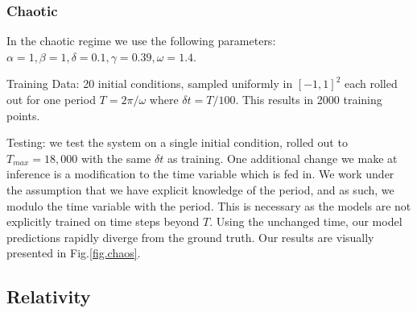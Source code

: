 \documentclass[twoside]{article}
\begin{document}
\subsubsection{Chaotic}

In the chaotic regime we use the following parameters:
$\alpha =1,\beta=1,\delta=0.1,\gamma=0.39,\omega=1.4$. 

Training Data: 20 initial conditions, sampled uniformly in $[-1,1]^2$ each rolled out for one period $T=2\pi/\omega$ where $\delta t = T/100$. This results in 2000 training points.

Testing: we test the system on a single initial condition, rolled out to $T_{max} = 18,000$ with the same $\delta t$ as training. One additional change we make at inference is a modification to the time variable which is fed in. We work under the assumption that we have explicit knowledge of the period, and as such, we modulo the time variable with the period. This is necessary as the models are not explicitly trained on time steps beyond $T$. Using the unchanged time, our model predictions rapidly diverge from the ground truth. Our results are visually presented in Fig.\ref{fig.chaos}.  
\subsection{Relativity}



\begin{table}[ht!]
\caption{Test Rollout MSE} 
\centering %
\label{tab:tests}
\end{table}

\pagebreak


\end{document}
